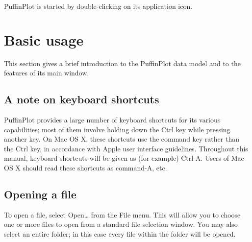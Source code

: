 \documentclass[a4paper,british]{article}
\begin{document}
PuffinPlot is started by double-clicking on its application icon.

\section{Basic usage}

This section gives a brief introduction to the PuffinPlot data model and
to the features of its main window.

\subsection{A note on keyboard shortcuts}

PuffinPlot provides a large number of keyboard shortcuts for its various
capabilities; most of them involve holding down the Ctrl key while
pressing another key. On Mac OS X, these shortcuts use the command key
rather than the Ctrl key, in accordance with Apple user interface
guidelines. Throughout this manual, keyboard shortcuts will be given as
(for example) Ctrl-A. Users of Mac OS X should read these shortcuts as
command-A, etc.

\subsection{Opening a file}

To open a file, select \textsf{Open\ldots} from the \textsf{File} menu. This
will allow you to choose one or more files to open from a standard file
selection window. You may also select an entire folder; in this case
every file within the folder will be opened.
\end{document}
